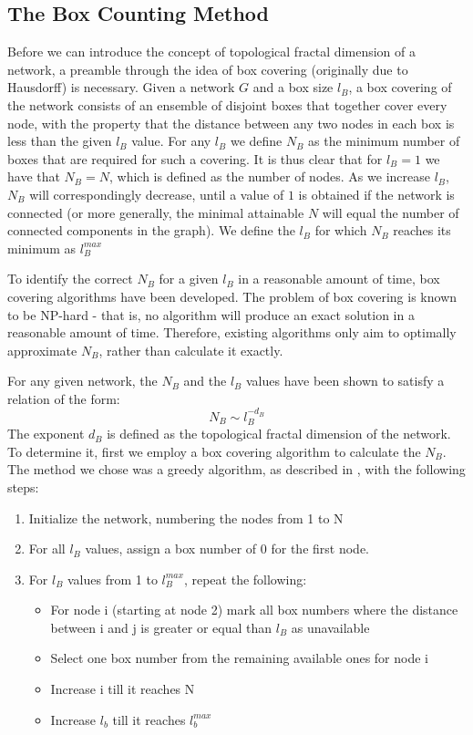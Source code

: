 \label{sec:3-task2}
\subsection{The Box Counting Method}

Before we can introduce the concept of topological fractal dimension of a network, a preamble through the idea of box covering (originally due to Hausdorff) is necessary. Given a network $G$ and a box size $l_B$, a box covering of the network consists of an ensemble of disjoint boxes that together cover every node, with the property that the distance between any two nodes in each box is less than the given $l_B$ value. For any $l_B$ we define $N_B$ as the minimum number of boxes that are required for such a covering. It is thus clear that for $l_B=1$ we have that $N_B = N$, which is defined as the number of nodes. As we increase $l_B$, $N_B$ will correspondingly decrease, until a value of $1$ is obtained if the network is connected (or more generally, the minimal attainable $N$ will equal the number of connected components in the graph). We define the $l_B$ for which $N_B$ reaches its minimum as $l_B^{max}$

To identify the correct $N_B$ for a given $l_B$ in a reasonable amount of time, box covering algorithms have been developed. The problem of box covering is known to be NP-hard - that is, no algorithm will produce an exact solution in a reasonable amount of time. Therefore, existing algorithms only aim to optimally approximate $N_B$, rather than calculate it exactly.

For any given network, the $N_B$ and the $l_B$ values have been shown to satisfy a relation of the form:
\begin{equation} 
	N_B \sim l_B^{-d_B} \label{eq:powerlaw}
\end{equation}
The exponent $d_B$ is defined as the topological fractal dimension of the network. To determine it, first we employ a box covering algorithm to calculate the $N_B$. The method we chose was a greedy algorithm, as described in \cite{song2007how}, with the following steps:
\begin{enumerate}
\setlength{\itemsep}{-1pt}
	\item Initialize the network, numbering the nodes from 1 to N
	\item For all $l_B$ values, assign a box number of 0 for the first node.
	\item For $l_B$ values from 1 to $l_B^{max}$, repeat the following:
	\begin{itemize}
    \setlength{\itemsep}{-1pt}
    	\item For node i (starting at node 2) mark all box numbers where the distance between i and j is greater or equal than $l_B$ as unavailable 
        \item Select one box number from the remaining available ones for node i
        \item Increase i till it reaches N
        \item Increase $l_b$ till it reaches $l_b^{max}$
	\end{itemize}
\end{enumerate}


